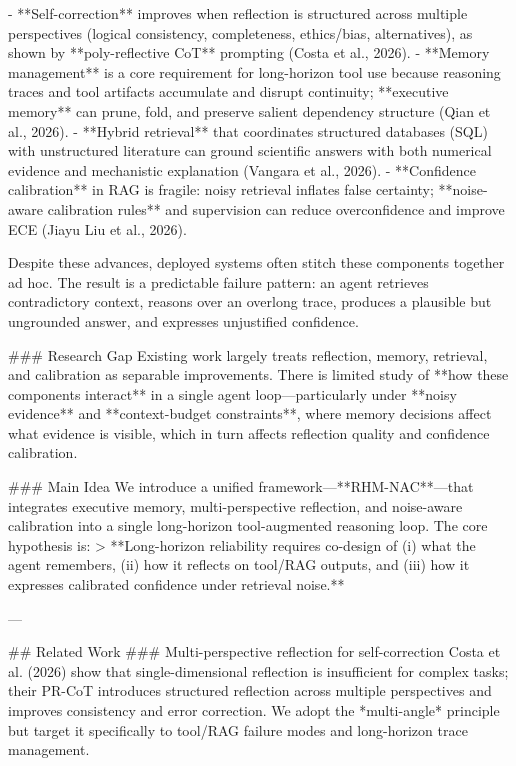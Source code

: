 - **Self-correction** improves when reflection is structured across multiple perspectives (logical consistency, completeness, ethics/bias, alternatives), as shown by **poly-reflective CoT** prompting (Costa et al., 2026).  
- **Memory management** is a core requirement for long-horizon tool use because reasoning traces and tool artifacts accumulate and disrupt continuity; **executive memory** can prune, fold, and preserve salient dependency structure (Qian et al., 2026).  
- **Hybrid retrieval** that coordinates structured databases (SQL) with unstructured literature can ground scientific answers with both numerical evidence and mechanistic explanation (Vangara et al., 2026).  
- **Confidence calibration** in RAG is fragile: noisy retrieval inflates false certainty; **noise-aware calibration rules** and supervision can reduce overconfidence and improve ECE (Jiayu Liu et al., 2026).  

Despite these advances, deployed systems often stitch these components together ad hoc. The result is a predictable failure pattern: an agent retrieves contradictory context, reasons over an overlong trace, produces a plausible but ungrounded answer, and expresses unjustified confidence.

### Research Gap  
Existing work largely treats reflection, memory, retrieval, and calibration as separable improvements. There is limited study of **how these components interact** in a single agent loop—particularly under **noisy evidence** and **context-budget constraints**, where memory decisions affect what evidence is visible, which in turn affects reflection quality and confidence calibration.  

### Main Idea  
We introduce a unified framework—**RHM-NAC**—that integrates executive memory, multi-perspective reflection, and noise-aware calibration into a single long-horizon tool-augmented reasoning loop. The core hypothesis is:  
> **Long-horizon reliability requires co-design of (i) what the agent remembers, (ii) how it reflects on tool/RAG outputs, and (iii) how it expresses calibrated confidence under retrieval noise.**

---

## Related Work  
### Multi-perspective reflection for self-correction  
Costa et al. (2026) show that single-dimensional reflection is insufficient for complex tasks; their PR-CoT introduces structured reflection across multiple perspectives and improves consistency and error correction. We adopt the *multi-angle* principle but target it specifically to tool/RAG failure modes and long-horizon trace management.

